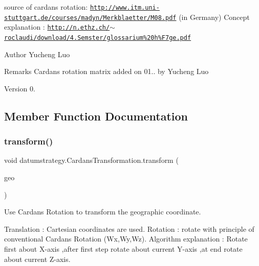 source of cardan\textquotesingle{}s rotation\+: \href{http://www.itm.uni-stuttgart.de/courses/madyn/Merkblaetter/M08.pdf}{\tt http\+://www.\+itm.\+uni-\/stuttgart.\+de/courses/madyn/\+Merkblaetter/\+M08.\+pdf} (in Germany) Concept explanation \+: \href{http://n.ethz.ch/~roclaudi/download/4.Semster/glossarium%20h%F7ge.pdf}{\tt http\+://n.\+ethz.\+ch/$\sim$roclaudi/download/4.\+Semster/glossarium\%20h\%\+F7ge.\+pdf} \begin{DoxyAuthor}{Author}
Yucheng Luo 
\end{DoxyAuthor}
\begin{DoxyRemark}{Remarks}
Cardan\textquotesingle{}s rotation matrix added on 01.. by Yucheng Luo 
\end{DoxyRemark}
\begin{DoxyVersion}{Version}
0. 
\end{DoxyVersion}


\subsection{Member Function Documentation}
\mbox{\label{classdatumstrategy_1_1_cardans_transformation_addccd1b729d860e578cd11154d8f63e2}} 
\subsubsection{\texorpdfstring{transform()}{transform()}}
{\footnotesize\ttfamily void datumstrategy.\+Cardans\+Transformation.\+transform (\begin{DoxyParamCaption}\item[{\hyperlink{classcoordinates_1_1_geographic_coordinate_interface}{Geographic\+Coordinate\+Interface}}]{geo }\end{DoxyParamCaption})}



Use Cardan\textquotesingle{}s Rotation to transform the geographic coordinate. 

Translation \+: Cartesian coordinates are used. Rotation \+: rotate with principle of conventional Cardan\textquotesingle{}s Rotation (Wx,Wy,Wz). Algorithm explanation \+: Rotate first about X-\/axis ,after first step rotate about current Y-\/axis ,at end rotate about current Z-\/axis.

